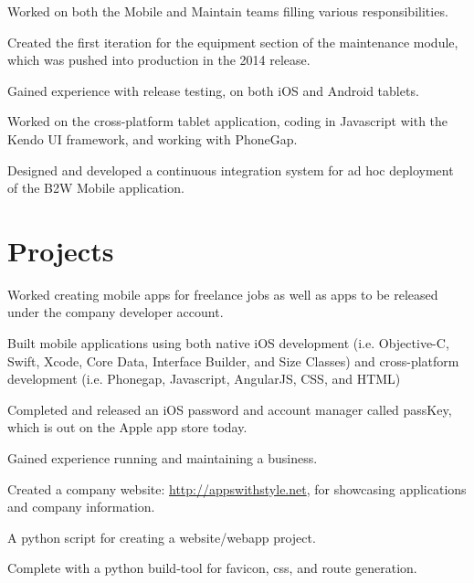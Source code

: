 \documentclass[]{resume}
\begin{document}
\begin{minipage}[t]{0.66\textwidth}
\begin{tightemize} \item Worked on both the Mobile and Maintain teams filling various responsibilities. \item Created the first iteration for the equipment section of the maintenance module, which was pushed into production in the 2014 release. \item Gained experience with release testing, on both iOS and Android tablets. \item Worked on the cross-platform tablet application, coding in Javascript with the Kendo UI framework, and working with PhoneGap. \item Designed and developed a continuous integration system for ad hoc deployment of the B2W Mobile application. \end{tightemize}
\sectionsep


\section{Projects}
\begin{tightemize} \item Worked creating mobile apps for freelance jobs as well as apps to be released under the company developer account. \item Built mobile applications using both native iOS development (i.e. Objective-C, Swift, Xcode, Core Data, Interface Builder, and Size Classes) and cross-platform development (i.e. Phonegap, Javascript, AngularJS, CSS, and HTML) \item Completed and released an iOS password and account manager called passKey, which is out on the Apple app store today.\item Gained experience running and maintaining a business. \item Created a company website: \url{http://appswithstyle.net}, for showcasing applications and company information. \end{tightemize}
\sectionsep

\fontsize{10pt}{12pt}\selectfont {} \normalfont
\begin{tightemize} \item A python script for creating a website/webapp project. \item Complete with a python build-tool for favicon, css, and route generation. \end{tightemize}
\sectionsep

\end{minipage}
\end{document}
